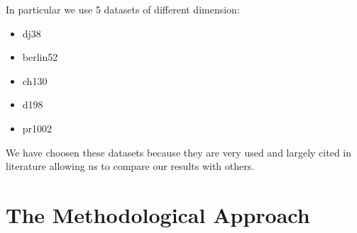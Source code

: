 \documentclass[10pt]{article}
\begin{document}
In particular we use 5 datasets of different dimension:
\begin{itemize}[noitemsep]
\item dj38
\item berlin52
\item ch130
\item d198
\item pr1002
\end{itemize}
We have choosen these datasets because they are very used and largely cited in literature allowing us to compare our results with others.
\section{The Methodological Approach}
\end{document}
